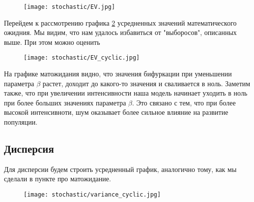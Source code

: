         \begin{figure}
            \centering
            \texttt{[image: stochastic/EV.jpg]}
        
            \captionsetup{justification=centering}
            \caption{}
            \label{EV}
        \end{figure}

        Перейдем к рассмотрению графика \ref{EV_cyclic} усредненных значений математического ожидния. Мы видим, что нам удалось избавиться от "выборосов", описанных выше. При этом можно оценить 
        
        \begin{figure}
            \centering
            \texttt{[image: stochastic/EV\_cyclic.jpg]}
        
            \captionsetup{justification=centering}
            \caption{}
            \label{EV_cyclic}
        \end{figure}

        На графике матожидания видно, что значения бифуркации при уменьшении параметра \(\beta\) растет, доходит до какого-то значения и сваливается в ноль. Заметим также, что при увеличении интенсивности наша модель начинает уходить в ноль при более больших значениях параметра \(\beta\). Это связано с тем, что при более высокой интенсивноти, шум оказывает более сильное влияние на развитие популяции.





    \subsection{Дисперсия}

        Для дисперсии будем строить усредненный график, аналогично тому, как мы сделали в пункте про матожидание.

        
        \begin{figure}
            \centering
            \texttt{[image: stochastic/variance\_cyclic.jpg]}
        
            \captionsetup{justification=centering}
            \caption{}
            \label{variance_cyclic}
        \end{figure}

